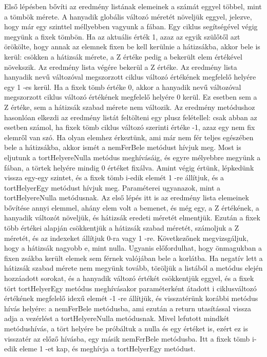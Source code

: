 Első lépésben bővíti az eredmény listának elemeinek a számát eggyel többel, mint a tömbök mérete. A hanyadik globális változó méretét növeljük eggyel, jelezve, hogy már egy szinttel méllyebben vagyunk a fában. Egy ciklus segítségével végig megyünk a fixek tömbön. Ha az aktuális érték 1, azaz az egyik szülőtől azt örökölte, hogy annak az elemnek fixen be kell kerülnie a hátizsákba, akkor bele is kerül: csökken a hátizsák mérete, a Z értéke pedig a bekerült elem értékével növekszik. Az eredmény lista végére bekerül a Z értéke. Az eredmény lista hanyadik nevű változóval megszorzott ciklus változó értékének megfelelő helyére egy 1 -es kerül. Ha a fixek tömb értéke 0, akkor a hanyadik nevű változóval megszorzott ciklus változó értékének megfelelő helyére 0 kerül. Ez esetben sem a Z értéke, sem a hátizsák szabad mérete nem változik. Az eredmény metódushoz hasonlóan elkezdi az eredmény listát feltölteni egy plusz felétellel: csak abban az esetben számol, ha fixek tömb ciklus változó szerinti értéke -1, azaz egy nem fix elemről van szó. Ha olyan elemhez érkeztünk, ami már nem fér teljes egészében bele a hátizsákba, akkor ismét a nemFerBele metódust hívjuk meg. Most is eljutunk a tortHelyereNulla metódus meghívásáig, és egyre mélyebbre megyünk a fában, a törtek helyére mindig 0 értéket fixálva. Amint végig értünk, lépkedünk vissza egy-egy szintet, és a fixek tömb i-edik elemét 1 -re állítjuk, és a tortHelyerEgy metódust hívjuk meg. Paraméterei ugyanazok, mint a tortHelyereNulla metódusnak. Az első lépés itt is az eredmény lista elemeinek bővítése annyi elemmel, ahány elem volt a bemenet, és még egy, a Z értékének, a hanyadik változót növeljük, és hátizsák eredeti méretét elmentjük. Ezután a fixek több értékei alapján csökkentjük a hátizsák szabad méretét, számoljuk a Z méretét, és az indexeket állítjuk 0-ra vagy 1 -re. Következőnek megvizsgáljuk, hogy a hátizsák nagyobb e, mint nulla. Ugyanis előfordulhat, hogy önmagukban a fixen zsákba került elemek sem férnek valójában bele a korlátba. Ha negatív lett a hátizsák szabad mérete nem megyünk tovább, töröljük a listából a metódus elején hozzáadott sorokat, és a hanyadik változó értékét csökkentjük eggyel, és a fixek tört tortHelyerEgy metódus meghívásakor paraméterként átadott i ciklusváltozó értékének megfelelő idexű elemét -1 -re állítjük, és visszatérünk korábbi metódus hívás helyére: a nemFerBele metódusba, ami ezután a return utasítással vissza adja a vezérlést a tortHelyereNulla metódusnak. Mivel lefutott mindkét metódushívás, a tört helyére be próbáltuk a nulla és egy értéket is, ezért ez is visszatér az előző hívásba, egy másik nemFerBele metódusba. Itt a fixek tömb i-edik eleme 1 -et kap, és meghívja a tortHelyerEgy metódust.
